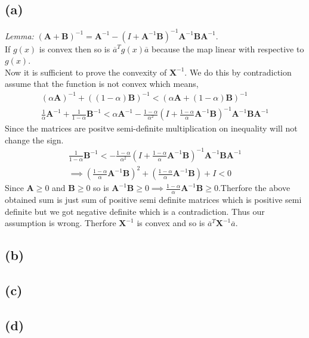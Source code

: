 \documentclass{article}
\begin{document}
\subsection*{(a)}
\textit{Lemma:} $(\mathbf{A} + \mathbf{B})^{-1} = \mathbf{A}^{-1} - (I + \mathbf{A}^{-1}\mathbf{B})^{-1}\mathbf{A}^{-1}\mathbf{B}\mathbf{A}^{-1}$.\\
If $g(x)$ is convex then so is $\overline{a}^Tg(x)\overline{a}$ because the map linear with respective to $g(x)$.\\
Now it is sufficient to prove the convexity of $\mathbf{X}^{-1}$. We do this by contradiction assume that the function is not convex which means,
\begin{gather*}
	(\alpha \mathbf{A})^{-1} + ((1-\alpha)\mathbf{B})^{-1} < \left(\alpha \mathbf{A} + (1-\alpha)\mathbf{B}\right)^{-1}\\
	\frac{1}{\alpha} \mathbf{A}^{-1} + \frac{1}{1-\alpha}\mathbf{B}^{-1} < \alpha \mathbf{A}^{-1} - \frac{1-\alpha}{\alpha ^2}(I + \frac{1-\alpha}{\alpha}\mathbf{A}^{-1}\mathbf{B})^{-1}\mathbf{A}^{-1}\mathbf{BA}^{-1}
\end{gather*}
Since the matrices are positve semi-definite multiplication on inequality will not change the sign.
\begin{gather*}
	\frac{1}{1-\alpha}\mathbf{B}^{-1} <  - \frac{1-\alpha}{\alpha ^2}(I + \frac{1-\alpha}{\alpha}\mathbf{A}^{-1}\mathbf{B})^{-1}\mathbf{A}^{-1}\mathbf{BA}^{-1}\\
	\implies \left(\frac{1-\alpha}{\alpha}\mathbf{A}^{-1}\mathbf{B}\right)^2 + \left(\frac{1-\alpha}{\alpha}\mathbf{A}^{-1}\mathbf{B}\right) + I < 0
\end{gather*}
Since $\mathbf{A} \ge 0$ and $\mathbf{B} \ge 0$ so is $\mathbf{A}^{-1}\mathbf{B} \ge 0 \implies \frac{1-\alpha}{\alpha}\mathbf{A}^{-1}\mathbf{B} \ge 0$.Therfore the above obtained sum is just sum of positive semi definite matrices which is positive semi definite but we got negative definite which is a contradiction. Thus our assumption is wrong. Therfore $\mathbf{X}^{-1}$ is convex and so is $\overline{a}^T\mathbf{X}^{-1}\overline{a}$.
\subsection*{(b)}

\subsection*{(c)}

\subsection*{(d)}
\end{document}

